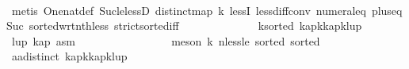 \begin{isabellebody}
\ \ \ \ \ \ \ \ \ \ \ \ \ \ \isamarkupfalse%
\ {\isacharparenleft}{\kern0pt}metis\ One{\isacharunderscore}{\kern0pt}nat{\isacharunderscore}{\kern0pt}def\ Suc{\isacharunderscore}{\kern0pt}le{\isacharunderscore}{\kern0pt}lessD\ distinct{\isacharunderscore}{\kern0pt}map\ k{}\ lessI\ less{\isacharunderscore}{\kern0pt}diff{\isacharunderscore}{\kern0pt}conv\ numeral{\isacharunderscore}{\kern0pt}{}{\isacharunderscore}{\kern0pt}eq{\isacharunderscore}{\kern0pt}{}\ plus{\isacharunderscore}{\kern0pt}{}{\isacharunderscore}{\kern0pt}eq{\isacharunderscore}{\kern0pt}Suc\ sorted{\isacharunderscore}{\kern0pt}wrt{\isacharunderscore}{\kern0pt}nth{\isacharunderscore}{\kern0pt}less\ strict{\isacharunderscore}{\kern0pt}sorted{\isacharunderscore}{\kern0pt}iff{\isacharparenright}{\kern0pt}\isanewline
\ \ \ \ \ \ \ \ \ \ \ \ \isamarkupfalse%
\ k{}{}{\isacharcolon}{\kern0pt}{\isachardoublequoteopen}sorted\ {\isacharbrackleft}{\kern0pt}{\isacharparenleft}{\kern0pt}kap{\isacharbang}{\kern0pt}{\isacharparenleft}{\kern0pt}k{\isacharminus}{\kern0pt}{}{\isacharparenright}{\kern0pt}{\isacharparenright}{\kern0pt}{\isacharcomma}{\kern0pt}{\isacharparenleft}{\kern0pt}kap{\isacharbang}{\kern0pt}{\isacharparenleft}{\kern0pt}k{\isacharminus}{\kern0pt}{}{\isacharparenright}{\kern0pt}{\isacharparenright}{\kern0pt}{\isacharcomma}{\kern0pt}{\isacharparenleft}{\kern0pt}lup{\isacharbang}{\kern0pt}{}{\isacharparenright}{\kern0pt}{\isacharbrackright}{\kern0pt}{\isachardoublequoteclose}\ \isamarkupfalse%
\ lup\ kap\ asm\ \isanewline
\ \ \ \ \ \ \ \ \ \ \ \ \ \ \isamarkupfalse%
\ {\isacharparenleft}{\kern0pt}meson\ k{}\ nless{\isacharunderscore}{\kern0pt}le\ sorted{}\ sorted{}{\isacharparenright}{\kern0pt}\isanewline
\ \ \ \ \ \ \ \ \ \ \ \ \isamarkupfalse%
\ aa{}{\isacharcolon}{\kern0pt}{\isachardoublequoteopen}distinct\ {\isacharbrackleft}{\kern0pt}{\isacharparenleft}{\kern0pt}kap{\isacharbang}{\kern0pt}{\isacharparenleft}{\kern0pt}k{\isacharminus}{\kern0pt}{}{\isacharparenright}{\kern0pt}{\isacharparenright}{\kern0pt}{\isacharcomma}{\kern0pt}{\isacharparenleft}{\kern0pt}kap{\isacharbang}{\kern0pt}{\isacharparenleft}{\kern0pt}k{\isacharminus}{\kern0pt}{}{\isacharparenright}{\kern0pt}{\isacharparenright}{\kern0pt}{\isacharcomma}{\kern0pt}{\isacharparenleft}{\kern0pt}lup{\isacharbang}{\kern0pt}{}{\isacharparenright}{\kern0pt}{\isacharbrackright}{\kern0pt}{\isachardoublequoteclose}\ \isamarkupfalse%

\end{isabellebody}
